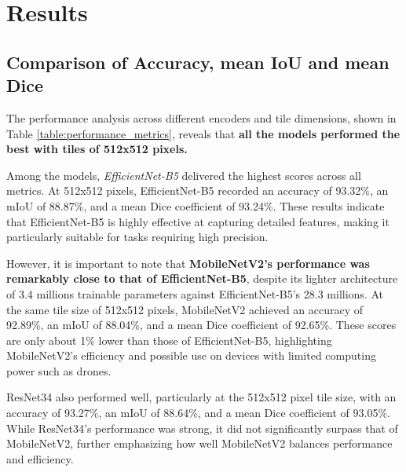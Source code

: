 \documentclass[a4paper]{article}
\begin{document}
\section{Results}
\subsection{Comparison of Accuracy, mean IoU and mean Dice}
The performance analysis across different encoders and tile dimensions, shown in Table \ref{table:performance_metrics}, reveals that \textbf{all the models performed the best with tiles of 512x512 pixels.}

Among the models, \textit{EfficientNet-B5} delivered the highest scores across all metrics. At 512x512 pixels, EfficientNet-B5 recorded an accuracy of 93.32\%, an mIoU of 88.87\%, and a mean Dice coefficient of 93.24\%. These results indicate that EfficientNet-B5 is highly effective at capturing detailed features, making it particularly suitable for tasks requiring high precision.

However, it is important to note that \textbf{MobileNetV2's performance was remarkably close to that of EfficientNet-B5}, despite its lighter architecture of 3.4 millions trainable parameters against EfficientNet-B5's 28.3 millions. At the same tile size of 512x512 pixels, MobileNetV2 achieved an accuracy of 92.89\%, an mIoU of 88.04\%, and a mean Dice coefficient of 92.65\%. These scores are only about 1\% lower than those of EfficientNet-B5, highlighting MobileNetV2's efficiency and possible use on devices with limited computing power such as drones.

ResNet34 also performed well, particularly at the 512x512 pixel tile size, with an accuracy of 93.27\%, an mIoU of 88.64\%, and a mean Dice coefficient of 93.05\%. While ResNet34's performance was strong, it did not significantly surpass that of MobileNetV2, further emphasizing how well MobileNetV2 balances performance and efficiency.
\end{document}
